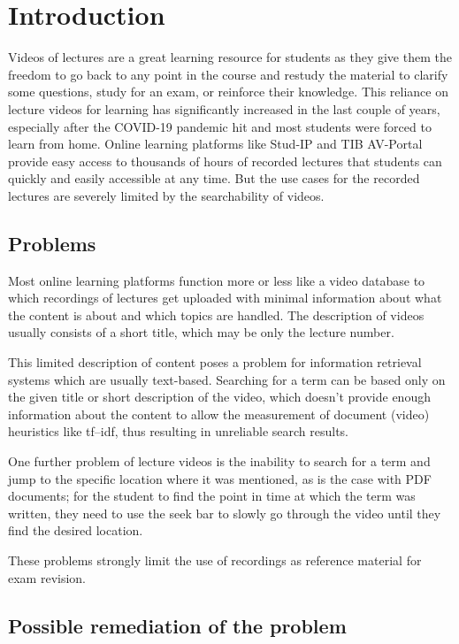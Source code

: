 
\chapter{Introduction}
\label{ch:intro}

Videos of lectures are a great learning resource for students as they give them the freedom to go back to any point in the course and restudy the material to clarify some questions, study for an exam, or reinforce their knowledge.
This reliance on lecture videos for learning has significantly increased in the last couple of years, especially after the COVID-19 pandemic hit and most students were forced to learn from home.
Online learning platforms like Stud-IP and TIB AV-Portal provide easy access to thousands of hours of recorded lectures that students can quickly and easily accessible at any time.
But the use cases for the recorded lectures are severely limited by the searchability of videos.

\section{Problems}
Most online learning platforms function more or less like a video database to which recordings of lectures get uploaded with minimal information about what the content is about and which topics are handled. The description of videos usually consists of a short title, which may be only the lecture number.

This limited description of content poses a problem for information retrieval systems which are usually text-based. Searching for a term can be based only on the given title or short description of the video, which doesn't provide enough information about the content to allow the measurement of document (video) heuristics like \gls{tf–idf}, thus resulting in unreliable search results.

One further problem of lecture videos is the inability to search for a term and jump to the specific location where it was mentioned, as is the case with PDF documents; for the student to find the point in time at which the term was written, they need to use the seek bar to slowly go through the video until they find the desired location.

These problems strongly limit the use of recordings as reference material for exam revision.

\section{Possible remediation of the problem}

